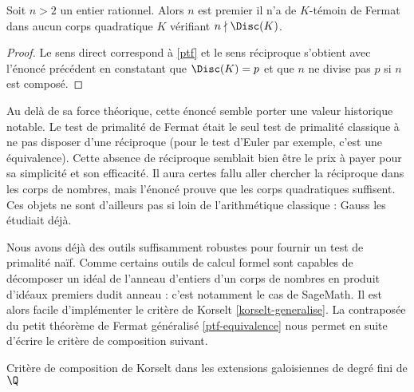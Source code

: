 \begin{theoreme}\label{ptf-equivalence}
	Soit $n>2$ un entier rationnel. Alors $n$ est premier \ssi il n'a de $K$-témoin de Fermat dans aucun corps quadratique $K$ vérifiant $n\nmid \Disc(K)$.
\end{theoreme}

\begin{proof}
	Le sens direct correspond à \ref{ptf} et le sens réciproque s'obtient avec l'énoncé précédent en constatant que $\Disc(K) = p$ et que $n$ ne divise pas $p$ si $n$ est composé.
\end{proof}

\begin{remarque}
Au delà de sa force théorique, cette énoncé semble porter une valeur historique notable. Le test de primalité de Fermat était le seul test de primalité classique à ne pas disposer d'une réciproque (pour le test d'Euler par exemple, c'est une équivalence). Cette absence de réciproque semblait bien être le prix à payer pour sa simplicité et son efficacité. Il aura certes fallu aller chercher la réciproque dans les corps de nombres, mais l'énoncé prouve que les corps quadratiques suffisent. Ces objets ne sont d'ailleurs pas si loin de l'arithmétique classique : Gauss les étudiait déjà.
\end{remarque}

Nous avons déjà des outils suffisamment robustes pour fournir un test de primalité naïf. Comme certains outils de calcul formel sont capables de décomposer un idéal de l'anneau d'entiers d'un corps de nombres en produit d'idéaux premiers dudit anneau : c'est notamment le cas de SageMath. Il est alors facile d'implémenter le critère de Korselt \ref{korselt-generalise}. La contraposée du petit théorème de Fermat généralisé \ref{ptf-equivalence} nous permet en suite d'écrire le critère de composition suivant.

\vspace{1em}
\begin{algorithm}[H]\label{test-primalite-korselt}
\caption{Critère de composition de Korselt dans les extensions galoisiennes de degré fini de $\Q$}
\end{algorithm}
\vspace{1em}

